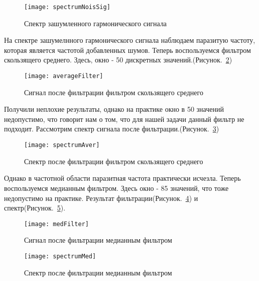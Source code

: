 \begin{figure}[H]
	\begin{center}
		\texttt{[image: spectrumNoisSig]}
		\caption{Спектр зашумленного гармонического сигнала} 
		\label{pic:spectrumNoisSig} %
	\end{center}
\end{figure}

На спектре зашумелнного гармонического сигнала наблюдаем паразитую частоту, которая является частотой добавленных шумов. Теперь воспользуемся фильтром скользящего среднего. Здесь, окно - 50 дискретных значений.(Рисунок.~\ref{pic:averageFilter})

\begin{figure}[H]
	\begin{center}
		\texttt{[image: averageFilter]}
		\caption{Сигнал после фильтрации фильтром скользящего среднего} 
		\label{pic:averageFilter} %
	\end{center}
\end{figure}

Получили неплохие результаты, однако на практике окно в 50 значений недопустимо, что говорит нам о том, что для нашей задачи данный фильтр не подходит. Рассмотрим спектр сигнала после фильтрации.(Рисунок.~\ref{pic:spectrumAver})

\begin{figure}[H]
	\begin{center}
		\texttt{[image: spectrumAver]}
		\caption{Спектр после фильтрации фильтром скользящего среднего} 
		\label{pic:spectrumAver} %
	\end{center}
\end{figure}

Однако в частотной области паразитная частота практически исчезла.
Теперь воспользуемся медианным фильтром. Здесь окно - 85 значений, что тоже недопустимо на практике. Результат фильтрации(Рисунок.~\ref{pic:medFilter}) и спектр(Рисунок.~\ref{pic:spectrumMed}).

\begin{figure}[H]
	\begin{center}
		\texttt{[image: medFilter]}
		\caption{Сигнал после фильтрации медианным фильтром} 
		\label{pic:medFilter} %
	\end{center}
\end{figure}

\begin{figure}[H]
	\begin{center}
		\texttt{[image: spectrumMed]}
		\caption{Спектр после фильтрации медианным фильтром} 
		\label{pic:spectrumMed} %
	\end{center}
\end{figure}

